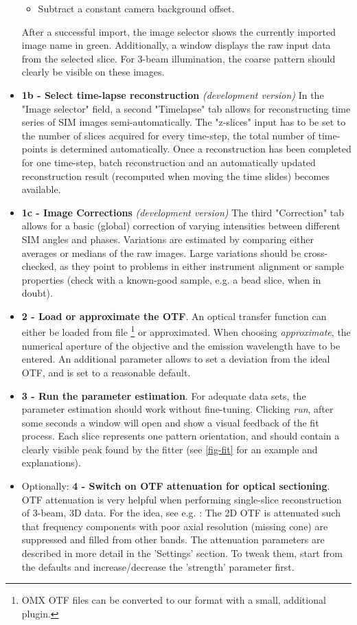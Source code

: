 \documentclass[twoside=false,
           twocolumn=false,
           a4paper,DIV=15,
           10pt]{scrartcl}
\newcommand{\devmarker}{\textit{(development version) }}
\begin{document}
\begin{itemize}
\begin{itemize}
\item Subtract a constant camera background offset.
\end{itemize}
After a successful import, the image selector shows the currently
imported image name in green. Additionally, a window displays
the raw input data from the selected slice. For 3-beam illumination,
the coarse pattern should clearly be visible on these images.
\item \textbf{1b - Select time-lapse reconstruction} \devmarker
In the "Image selector" field, a second "Timelapse" tab allows for reconstructing
time series of SIM images semi-automatically. The "z-slices" input has
to be set to the number of slices acquired for every time-step, the total
number of time-points is determined automatically. Once a reconstruction
has been completed for one time-step, batch reconstruction and an
automatically updated reconstruction result (recomputed when moving the time slides)
becomes available.
\item \textbf{1c - Image Corrections} \devmarker
The third "Correction" tab allows for a basic (global) correction of varying
intensities between different SIM angles and phases. Variations are estimated
by comparing either averages or medians of the raw images. Large variations
should be cross-checked, as they point to problems in either instrument alignment
or sample properties (check with a known-good sample, e.g. a bead slice, when in doubt).


\item \textbf{2 - Load or approximate the OTF}. An optical transfer function
can either be loaded from file
\footnote{OMX OTF files can be converted to our format with a 
small, additional plugin.}
or approximated. When choosing
\emph{approximate}, the numerical aperture of the objective and the emission wavelength
have to be entered. An additional parameter allows to set a deviation
from the ideal OTF, and is set to a reasonable default.
\item \textbf{3 - Run the parameter estimation}. 
For adequate data sets, the parameter estimation should work
without fine-tuning. Clicking \emph{run}, after some seconds
a window will open and show a visual feedback of the fit process.
Each slice represents one pattern orientation, and should contain
a clearly visible peak found by the fitter (see \cref{fig-fit} for an example and
explanations).
\item Optionally: \textbf{4 - Switch on OTF attenuation for optical sectioning}.\\
OTF attenuation is very helpful when performing single-slice reconstruction
of 3-beam, 3D data.
For the idea, see e.g. \cite{wicker2013-phase1}: The 2D OTF is attenuated
such that frequency components with poor axial resolution (missing cone)
are suppressed and filled from other bands. The attenuation
parameters are described in more detail in the 'Settings' section.
To tweak them, start from the defaults 
and increase/decrease the 'strength' parameter first.


\end{itemize}
\end{document}
